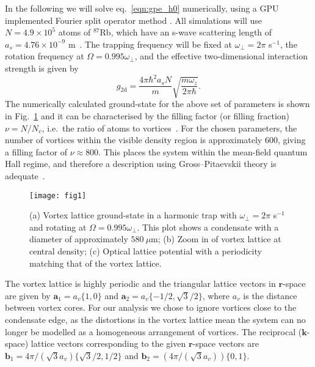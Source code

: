 In the following we will solve eq.~\eqref{eqn:gpe_h0} numerically, using a GPU implemented Fourier split operator method \cite{NUMERICS}.
All simulations will use $N=4.9\times 10^5$ atoms of $^{87}$Rb, which have an  s-wave scattering length of $a_s=4.76\times10^{-9}$ m~\cite{BEC:Roberts_prl_1998}. The trapping frequency will be fixed at $\omega_{\perp}=2\pi$ s$^{-1}$, the rotation frequency at $\Omega=0.995\omega_\perp$, and the effective two-dimensional interaction strength is given by
	\begin{equation}
		g_\text{2d} = \frac{4\pi\hbar^2 a_s N}{m}\sqrt{\frac{m\omega_z}{2\pi\hbar}}.
	\end{equation}
The numerically calculated ground-state for the above set of parameters is shown in Fig.~\ref{fig:vlatt_gnd} and it can be characterised by the filling factor (or filling fraction) $\nu=N/N_v$, i.e.~the ratio of atoms to vortices~\cite{BEC:Fetter_revmodphys_2009}. For the chosen parameters, the number of vortices within the visible density region is approximately 600, giving a filling factor of $\nu \approx 800 $. This places the system within the mean-field quantum Hall regime, and therefore a description using Gross--Pitaevskii theory is adequate~\cite{Vtx:Schweikhard_prl_2004}.
		\begin{figure}[tb]
			\texttt{[image: fig1]}
			\caption{(a) Vortex lattice ground-state in a harmonic trap with $\omega_\perp=2\pi$ s$^{-1}$ and rotating at $\Omega=0.995\omega_\perp$. This plot shows a condensate with a diameter of approximately $580~\mu\textrm{m}$; (b) Zoom in of vortex lattice at central density; (c) Optical lattice potential with a periodicity matching that of the vortex lattice.}
			\label{fig:vlatt_gnd}
		\end{figure}
The vortex lattice is highly periodic and the triangular lattice vectors in $\mathbf{r}$-space are given by $\mathbf{a}_1 = a_v\{1,0\}$ and $\mathbf{a}_2 = a_v\{-1/2, \sqrt{3}/2\}$, where $a_v$ is the distance between vortex cores. For our analysis we chose to ignore vortices close to the condensate edge, as the distortions in the vortex lattice mean the system can no longer be modelled as a homogeneous arrangement of vortices. The reciprocal ($\mathbf{k}$-space) lattice vectors corresponding to the given $\mathbf{r}$-space vectors are $\mathbf{b}_1 = 4\pi/(\sqrt{3}a_v)\{\sqrt{3}/2,1/2\}$ and $\mathbf{b}_2 = (4\pi/(\sqrt{3}a_v))\{0,1\}$.

